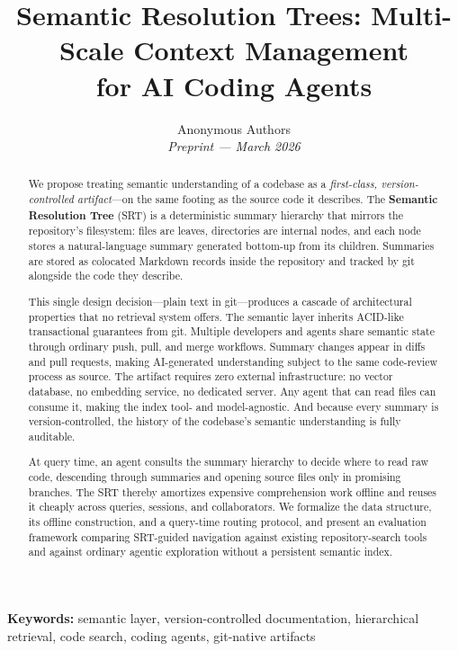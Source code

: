 \documentclass[11pt,a4paper]{article}
\title{\textbf{Semantic Resolution Trees: Multi-Scale Context Management\\for AI Coding Agents}}
\author{
  Anonymous Authors\\
  \textit{Preprint --- March 2026}
}
\date{}
\newcommand{\srt}{\textsc{SRT}}
\begin{document}
\maketitle

\begin{abstract}
We propose treating semantic understanding of a codebase as a \emph{first-class, version-controlled artifact}---on the same footing as the source code it describes.
The \textbf{Semantic Resolution Tree} (\srt{}) is a deterministic summary hierarchy that mirrors the repository's filesystem: files are leaves, directories are internal nodes, and each node stores a natural-language summary generated bottom-up from its children.
Summaries are stored as colocated Markdown records inside the repository and tracked by git alongside the code they describe.

This single design decision---plain text in git---produces a cascade of architectural properties that no retrieval system offers.
The semantic layer inherits ACID-like transactional guarantees from git.
Multiple developers and agents share semantic state through ordinary push, pull, and merge workflows.
Summary changes appear in diffs and pull requests, making AI-generated understanding subject to the same code-review process as source.
The artifact requires zero external infrastructure: no vector database, no embedding service, no dedicated server.
Any agent that can read files can consume it, making the index tool- and model-agnostic.
And because every summary is version-controlled, the history of the codebase's semantic understanding is fully auditable.

At query time, an agent consults the summary hierarchy to decide where to read raw code, descending through summaries and opening source files only in promising branches.
The \srt{} thereby amortizes expensive comprehension work offline and reuses it cheaply across queries, sessions, and collaborators.
We formalize the data structure, its offline construction, and a query-time routing protocol, and present an evaluation framework comparing \srt{}-guided navigation against existing repository-search tools and against ordinary agentic exploration without a persistent semantic index.
\end{abstract}

\noindent\textbf{Keywords:} semantic layer, version-controlled documentation, hierarchical retrieval, code search, coding agents, git-native artifacts
\end{document}
